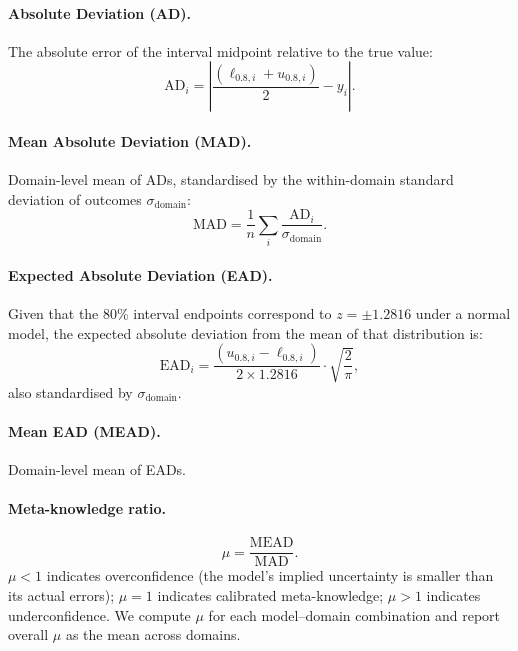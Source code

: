 \documentclass[9pt,twoside,lineno]{pnas-new}
\begin{document}
\paragraph{Absolute Deviation (AD).} The absolute error of the interval midpoint relative to the true value:
\begin{equation}
  \text{AD}_i = \left|\frac{(\ell_{0.8,i} + u_{0.8,i})}{2} - y_i\right|.
\end{equation}

\paragraph{Mean Absolute Deviation (MAD).} Domain-level mean of ADs, standardised by the within-domain standard deviation of outcomes $\sigma_{\text{domain}}$:
\begin{equation}
  \text{MAD} = \frac{1}{n}\sum_i \frac{\text{AD}_i}{\sigma_{\text{domain}}}.
\end{equation}

\paragraph{Expected Absolute Deviation (EAD).} Given that the 80\% interval endpoints correspond to $z = \pm 1.2816$ under a normal model, the expected absolute deviation from the mean of that distribution is:
\begin{equation}
  \text{EAD}_i = \frac{(u_{0.8,i} - \ell_{0.8,i})}{2 \times 1.2816} \cdot \sqrt{\frac{2}{\pi}},
\end{equation}
also standardised by $\sigma_{\text{domain}}$.

\paragraph{Mean EAD (MEAD).} Domain-level mean of EADs.

\paragraph{Meta-knowledge ratio.}
\begin{equation}
  \mu = \frac{\text{MEAD}}{\text{MAD}}.
  \label{eq:mu}
\end{equation}
$\mu < 1$ indicates overconfidence (the model's implied uncertainty is smaller than its actual errors); $\mu = 1$ indicates calibrated meta-knowledge; $\mu > 1$ indicates underconfidence. We compute $\mu$ for each model--domain combination and report overall $\mu$ as the mean across domains.
\end{document}
